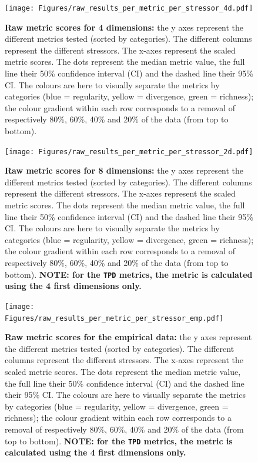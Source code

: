 \documentclass[12pt,letterpaper]{article}
\begin{document}
\begin{figure}[!htbp]
\centering
   \texttt{[image: Figures/raw\_results\_per\_metric\_per\_stressor\_4d.pdf]}
\caption{\scriptsize{\textbf{Raw metric scores for 4 dimensions:} the y axes represent the different metrics tested (sorted by categories).
The different columns represent the different stressors.
The x-axes represent the scaled metric scores.
The dots represent the median metric value, the full line their 50\% confidence interval (CI) and the dashed line their 95\% CI.
The colours are here to visually separate the metrics by categories (blue = regularity, yellow = divergence, green = richness); the colour gradient within each row corresponds to a removal of respectively 80\%, 60\%, 40\% and 20\% of the data (from top to bottom).
}}
\label{Fig:raw_results_4d}
\end{figure}
\bigskip


\begin{figure}[!htbp]
\centering
   \texttt{[image: Figures/raw\_results\_per\_metric\_per\_stressor\_2d.pdf]}
\caption{\scriptsize{\textbf{Raw metric scores for 8 dimensions:} the y axes represent the different metrics tested (sorted by categories).
The different columns represent the different stressors.
The x-axes represent the scaled metric scores.
The dots represent the median metric value, the full line their 50\% confidence interval (CI) and the dashed line their 95\% CI.
The colours are here to visually separate the metrics by categories (blue = regularity, yellow = divergence, green = richness); the colour gradient within each row corresponds to a removal of respectively 80\%, 60\%, 40\% and 20\% of the data (from top to bottom).
}
\textbf{NOTE: for the \texttt{TPD} metrics, the metric is calculated using the 4 first dimensions only.}
}
\label{Fig:raw_results_8d}
\end{figure}
\bigskip


\begin{figure}[!htbp]
\centering
   \texttt{[image: Figures/raw\_results\_per\_metric\_per\_stressor\_emp.pdf]}
\caption{\scriptsize{\textbf{Raw metric scores for the empirical data:} the y axes represent the different metrics tested (sorted by categories).
The different columns represent the different stressors.
The x-axes represent the scaled metric scores.
The dots represent the median metric value, the full line their 50\% confidence interval (CI) and the dashed line their 95\% CI.
The colours are here to visually separate the metrics by categories (blue = regularity, yellow = divergence, green = richness); the colour gradient within each row corresponds to a removal of respectively 80\%, 60\%, 40\% and 20\% of the data (from top to bottom).
\textbf{NOTE: for the \texttt{TPD} metrics, the metric is calculated using the 4 first dimensions only.}
}}
\label{Fig:raw_results_emp}
\end{figure}
\bigskip
\end{document}

